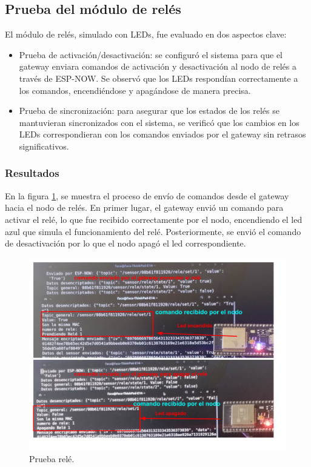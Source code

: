 \subsection{Prueba del módulo de relés}

El módulo de relés, simulado con LEDs, fue evaluado en dos aspectos clave:

\begin{itemize}
	\item Prueba de activación/desactivación: se configuró el sistema para que el gateway enviara comandos de activación y desactivación al nodo de relés a través de ESP-NOW. Se observó que los LEDs respondían correctamente a los comandos, encendiéndose y apagándose de manera precisa.
	\item Prueba de sincronización: para asegurar que los estados de los relés se mantuvieran sincronizados con el sistema, se verificó que los cambios en los LEDs correspondieran con los comandos enviados por el gateway sin retrasos significativos.
\end{itemize}

\subsubsection{Resultados}

En la figura \ref{fig:prueba_rele}, se muestra el proceso de envío de comandos desde el gateway hacia el nodo de relés. En primer lugar, el gateway envió un comando para activar el relé, lo que fue recibido correctamente por el nodo, encendiendo el led azul que simula el funcionamiento del relé. Posteriormente, se envió el comando de desactivación por lo que el nodo apagó el led correspondiente.

\begin{figure}[H]
\centering 
\includegraphics[width=1\textwidth]{./Figures/prueba_rele.png}
\caption{Prueba relé.}
\label{fig:prueba_rele}
\end{figure}

